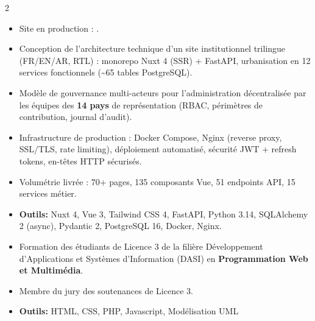 \documentclass[10pt,a4paper,ragged2e,withhyper]{altacv}
\begin{document}
\begin{paracol}{2}
            \begin{itemize}
                \item Site en production : .
                \item Conception de l'architecture technique d'un site institutionnel trilingue (FR/EN/AR, RTL) : monorepo Nuxt 4 (SSR) + FastAPI, urbanisation en 12 services fonctionnels (\textasciitilde65 tables PostgreSQL).
                \item Modèle de gouvernance multi-acteurs pour l'administration décentralisée par les équipes des \textbf{14 pays} de représentation (RBAC, périmètres de contribution, journal d'audit).
                \item Infrastructure de production : Docker Compose, Nginx (reverse proxy, SSL/TLS, rate limiting), déploiement automatisé, sécurité JWT + refresh tokens, en-têtes HTTP sécurisés.
                \item Volumétrie livrée : 70+ pages, 135 composants Vue, 51 endpoints API, 15 services métier.
                \item \textcolor{SecondaryColor}{\textbf{Outils: }} Nuxt 4, Vue 3, Tailwind CSS 4, FastAPI, Python 3.14, SQLAlchemy 2 (async), Pydantic 2, PostgreSQL 16, Docker, Nginx.
            \end{itemize}
            \divider

            \newpage

            \begin{itemize}
                \item Formation des étudiants de Licence 3 de la filière Développement d'Applications et Systèmes d'Information (DASI) en {\textbf{Programmation Web et Multimédia}}.
                \item Membre du jury des soutenances de Licence 3.
                \item \textcolor{SecondaryColor}{\textbf{Outils: }} HTML, CSS, PHP, Javascript, Modélisation UML
            \end{itemize}
            \divider


\end{paracol}
\end{document}
